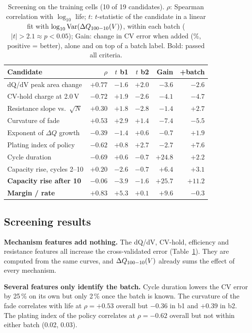 \begin{table}[!htb]
\centering
\caption{Screening on the training cells (10 of 19 candidates). $\rho$:
Spearman correlation with $\log_{10}$ life; $t$: $t$-statistic of the
candidate in a linear fit with $\log_{10}\mathrm{Var}(\Delta Q_{100-10}(V))$, within each batch
($|t|>2.1\approx p<0.05$); Gain: change in CV error when added (\%, positive
= better), alone and on top of a batch label. Bold: passed all criteria.}
\label{tab:screen}
\small
\setlength{\tabcolsep}{2.2pt}
\begin{tabular}{@{}lrrrrr@{}}
\toprule
Candidate & $\rho$ & $t$ b1 & $t$ b2 & Gain & +batch \\
\midrule
dQ/dV peak area change & $+0.77$ & $-1.6$ & $+2.0$ & $-3.6$ & $-2.6$ \\
CV-hold charge at 2.0\,V & $-0.72$ & $+1.9$ & $-2.6$ & $-4.1$ & $-4.7$ \\
Resistance slope vs.\ $\sqrt N$ & $+0.30$ & $+1.8$ & $-2.8$ & $-1.4$ & $+2.7$ \\
Curvature of fade & $+0.53$ & $+2.9$ & $+1.4$ & $-7.4$ & $-5.5$ \\
Exponent of $\Delta Q$ growth & $-0.39$ & $-1.4$ & $+0.6$ & $-0.7$ & $+1.9$ \\
Plating index of policy & $-0.62$ & $+0.8$ & $+2.7$ & $-2.7$ & $+7.6$ \\
Cycle duration & $-0.69$ & $+0.6$ & $-0.7$ & $+24.8$ & $+2.2$ \\
Capacity rise, cycles 2--10 & $+0.20$ & $-2.6$ & $-0.7$ & $+6.4$ & $+3.1$ \\
\textbf{Capacity rise after 10} & $-0.06$ & $-3.9$ & $-1.6$ & $+25.7$ & $+11.2$ \\
\textbf{Margin / rate} & $+0.83$ & $+5.3$ & $+0.1$ & $+9.6$ & $-0.3$ \\
\bottomrule
\end{tabular}
\end{table}

\subsection{Screening results}
\textbf{Mechanism features add nothing.} The dQ/dV, CV-hold, efficiency and
resistance features all increase the cross-validated error
(Table~\ref{tab:screen}). They are computed from the same curves, and $\Delta Q_{100-10}(V)$
already sums the effect of every mechanism.

\textbf{Several features only identify the batch.} Cycle duration lowers the
CV error by 25\,\% on its own but only 2\,\% once the batch is known. The
curvature of the fade correlates with life at $\rho=+0.53$ overall but
$-0.36$ in b1 and $+0.39$ in b2. The plating index of the policy
correlates at $\rho=-0.62$ overall but not within either batch (0.02,
0.03).

